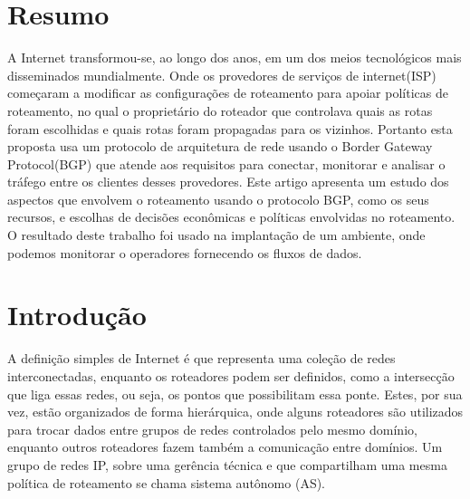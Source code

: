 \documentclass[12pt,a4paper]{report}
\begin{document}
\newpage

\chapter*{Resumo}
A Internet transformou-se, ao longo dos anos, em um dos meios tecnol\'ogicos mais disseminados mundialmente. Onde os provedores de servi\c{c}os de internet(ISP) come\c{c}aram a modificar as configura\c{c}\~oes de roteamento para apoiar pol\'iticas de roteamento, no qual o propriet\'ario do roteador que controlava quais as rotas foram escolhidas e quais rotas foram propagadas para os vizinhos. Portanto esta proposta usa um protocolo de arquitetura de rede usando o Border Gateway Protocol(BGP) que atende aos requisitos para conectar, monitorar e analisar o tr\'afego entre os clientes desses provedores. Este artigo apresenta um estudo dos aspectos que envolvem o roteamento usando o protocolo BGP, como os seus recursos, e escolhas de decis\~oes econ\^omicas e pol\'iticas envolvidas no roteamento. O resultado deste trabalho foi usado na implanta\c{c}\~ao de um ambiente, onde podemos monitorar o operadores fornecendo os fluxos de dados.

\newpage
\tableofcontents
\newpage

\pagestyle{fancy}
\renewcommand{\chaptermark}[1]{\markboth{#1}{}}
\renewcommand{\sectionmark}[1]{\markright{\thesection\ #1}}

\lhead[\fancyplain{}{\bfseries\leftmark}]{\fancyplain{}{\bfseries\leftmark}}
\rhead[\fancyplain{}{\bfseries\thepage}]{\fancyplain{}{\bfseries\thepage}}
\setlength{\footskip}{\dimexpr\headsep+1.5\baselineskip+.4pt}
\setcounter{page}{1}


\chapter{Introdu\c{c}\~ao}
A defini\c{c}\~ao simples de Internet \'e que representa uma cole\c{c}\~ao de redes interconectadas, enquanto os roteadores podem ser definidos, como a intersec\c{c}\~ao que liga essas redes, ou seja, os pontos que possibilitam essa ponte. Estes, por sua vez, est\~ao organizados de forma hier\'arquica, onde alguns roteadores s\~ao utilizados para trocar dados entre grupos de redes controlados pelo mesmo dom\'inio, enquanto outros roteadores fazem tamb\'em a comunica\c{c}\~ao entre dom\'inios. Um grupo de redes IP, sobre uma ger\^encia t\'ecnica e que compartilham uma mesma pol\'itica de roteamento se chama sistema aut\^onomo (AS).
\end{document}
